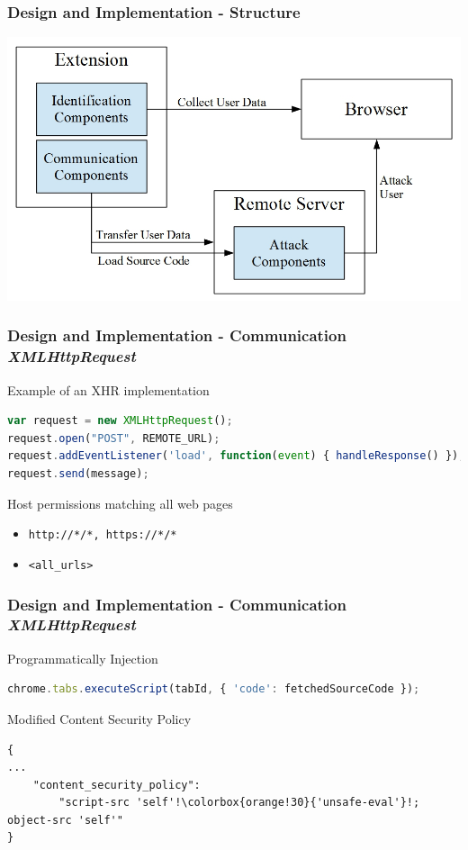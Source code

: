 \documentclass[accentcolor=tud9c,colorbacktitle,xcolor=dvipsnames]{tudbeamer}
\begin{document}
\begin{frame}
    \frametitle{Design and Implementation - Structure}
    \includegraphics[scale=0.3]{./graphics/design_overview.jpeg}
\end{frame}

\begin{frame}[fragile]
    \frametitle{Design and Implementation - Communication \\ \textit{XMLHttpRequest}}
    \begin{block}{Example of an XHR implementation}
        \begin{lstlisting}[language=JavaScript]
var request = new XMLHttpRequest();
request.open("POST", REMOTE_URL);
request.addEventListener('load', function(event) { handleResponse() });
request.send(message);
\end{lstlisting}
    \end{block}
    \begin{block}{Host permissions matching all web pages}
        \begin{itemize}
            \item \texttt{http://*/*, https://*/*}
            \item \texttt{<all\_urls>}
        \end{itemize}
    \end{block}
\end{frame}

\begin{frame}[fragile]
    \frametitle{Design and Implementation - Communication \\ \textit{XMLHttpRequest}}
    \begin{block}{Programmatically Injection}
        \begin{lstlisting}[language=JavaScript]
chrome.tabs.executeScript(tabId, { 'code': fetchedSourceCode });
\end{lstlisting}
    \end{block} 
    \begin{block}{Modified Content Security Policy}
        \begin{lstlisting}
{
...
    "content_security_policy": 
        "script-src 'self'!\colorbox{orange!30}{'unsafe-eval'}!; object-src 'self'"	
}
\end{lstlisting}       
    \end{block}
\end{frame}
\end{document}

